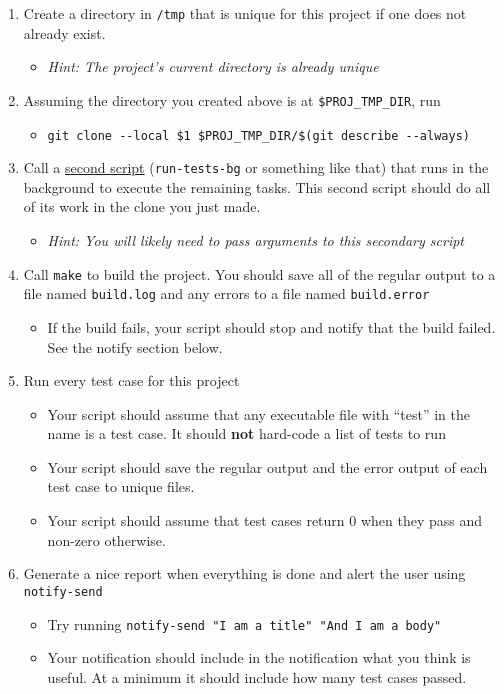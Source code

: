 \documentclass{article}
\begin{document}
\begin{enumerate}
    \item Create a directory in \texttt{/tmp} that is unique for this project if one does not already exist.
    \begin{itemize}
      \item \small \em Hint: The project's current directory is already unique
    \end{itemize}
  \item Assuming the directory you created above is at \texttt{\$PROJ\_TMP\_DIR}, run
    \begin{itemize}
      \item \texttt{git clone -{}-local \$1\ \$PROJ\_TMP\_DIR/\$(git describe -{}-always)}
    \end{itemize}
\item Call a \ul{second script} (\texttt{run-tests-bg} or something like that) that runs in the background to execute the
    remaining tasks. This second script should do all of its work in the clone
    you just made.
    \begin{itemize}
      \item \small \em Hint: You will likely need to pass arguments to this secondary script
    \end{itemize}
  \item Call \texttt{make} to build the project. You should save all of the
    regular output to a file named \texttt{build.log} and any errors to a file
    named \texttt{build.error}
    \begin{itemize}
      \item If the build fails, your script should stop and notify that the
        build failed. See the notify section below.
    \end{itemize}
  \item Run every test case for this project
    \begin{itemize}
      \item Your script should assume that any executable file with ``test''
        in the name is a test case. It should \textbf{not} hard-code a list of
        tests to run
      \item Your script should save the regular output and the error output of
        each test case to unique files.
      \item Your script should assume that test cases return 0 when they
        pass and non-zero otherwise.
    \end{itemize}
        \pagebreak
\item Generate a nice report when everything is done and alert the user
    using \texttt{notify-send}
        \begin{itemize}
            \item Try running \texttt{notify-send "I am a title" "And I am a body"}
            \item Your notification should include in the notification what you
                think is useful. At a minimum it should include how many test
                cases passed.
        \end{itemize}
\end{enumerate}
\end{document}
